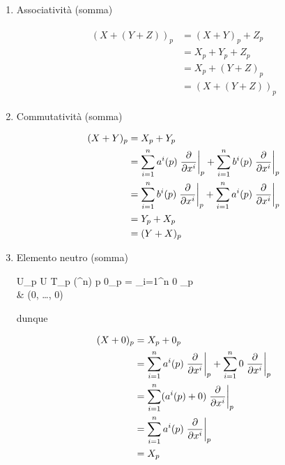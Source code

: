 \begin{enumerate}
	\item Associatività (somma)
	
		\begin{align}
			\begin{split}
				(X + (Y + Z))_{p} &= (X + Y)_{p} + Z_{p}\\
				&= X_{p} + Y_{p} + Z_{p}\\
				&= X_{p} + (Y + Z)_{p}\\
				&= (X + (Y + Z))_{p}
			\end{split}
		\end{align}
	
	\item Commutatività (somma)
	
		\begin{align}
			\begin{split}
				(X + Y)_{p} &= X_{p} + Y_{p}\\
				&= \sum_{i=1}^{n} a^{i} (p) \eval{ \pdv{x^{i}} }_{p} + \sum_{i=1}^{n} b^{i} (p) \eval{ \pdv{x^{i}} }_{p}\\
				&= \sum_{i=1}^{n} b^{i} (p) \eval{ \pdv{x^{i}} }_{p} + \sum_{i=1}^{n} a^{i} (p) \eval{ \pdv{x^{i}} }_{p}\\
				&= Y_{p} + X_{p}\\
				&= (Y + X)_{p}
			\end{split}
		\end{align}
	
	\item Elemento neutro (somma)
	
			{U}{\bigsqcup_{p \in U} T_{p} (\R^{n})}
			{p}{%
				0_{p} = \sum_{i=1}^{n} 0 _{p}\\
				& (0, \dots, 0)%
				}
			
		dunque
		
		\begin{align}
			\begin{split}
				(X + 0)_{p} &= X_{p} + 0_{p}\\
				&= \sum_{i=1}^{n} a^{i} (p) \eval{ \pdv{x^{i}} }_{p} + \sum_{i=1}^{n} 0 \eval{ \pdv{x^{i}} }_{p}\\
				&= \sum_{i=1}^{n} (a^{i} (p) + 0) \eval{ \pdv{x^{i}} }_{p}\\
				&= \sum_{i=1}^{n} a^{i} (p) \eval{ \pdv{x^{i}} }_{p}\\
				&= X_{p}
			\end{split}
		\end{align}
	

\end{enumerate}
